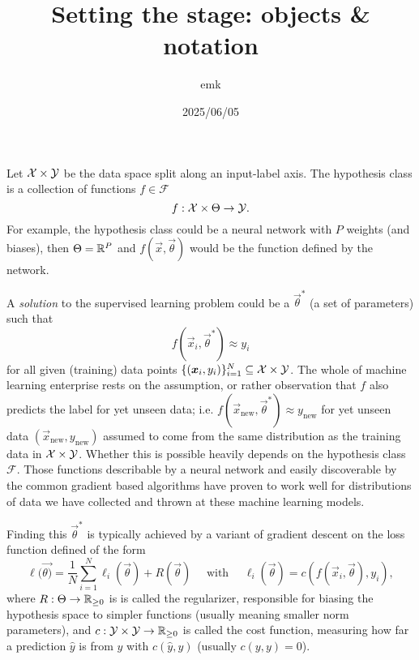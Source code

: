 \documentclass[12pt]{amsart}
\title{Setting the stage: objects \& notation}
\author{emk}
\date{2025/06/05}
\begin{document}
\maketitle

Let $\mathcal{X} \times \mathcal{Y}$ be the data space split along an input-label axis. The hypothesis class is a collection of functions $f \in \mathcal{F}$
\[
	f : \mathcal{X} \times \Theta \to \mathcal{Y}.
\]
For example, the hypothesis class could be a neural network with $P$ weights (and biases), then $\Theta = \mathbb{R}^P$ and $f(\vec{x}, \vec{\theta})$ would be the function defined by the network.


A \emph{solution} to the supervised learning problem could be a $\vec{\theta}^*$ (a set of parameters) such that $$f(\vec{x}_i, \vec{\theta}^*) \approx y_i$$
for all given (training) data points $\{(\mathbf{\boldsymbol{x}}_i, y_i)\}_{i = 1}^N \subseteq \mathcal{X} \times \mathcal{Y}$. The whole of machine learning enterprise rests on the assumption, or rather observation that $f$ also predicts the label for yet unseen data; i.e. $f(\vec{x}_{\text{new}}, \vec{\theta}^*) \approx y_{\text{new}}$ for yet unseen data $(\vec{x}_{\text{new}}, y_{\text{new}})$ assumed to come from the same distribution as the training data in $\mathcal{X} \times \mathcal{Y}$. Whether this is possible heavily depends on the hypothesis class $\mathcal{F}$. Those functions describable by a neural network and easily discoverable by the common gradient based algorithms have proven to work well for distributions of data we have collected and thrown at these machine learning models.

Finding this $\vec \theta^*$ is typically achieved by a variant of gradient descent on the loss function defined of the form
\begin{equation}\label{eq:lossfn}
	\ell(\vec{\theta)} = \frac{1}{N} \sum_{i = 1}^N \ell_i(\vec{\theta}) + R(\vec{\theta}) \quad \text{ with } \quad \ell_i(\vec{\theta}) = c(f(\vec{x}_i, \vec{\theta}), y_i),
\end{equation}
where $R :\Theta \to \mathbb{R}_{\geq 0 }$ is is called the regularizer, responsible for biasing the hypothesis space to simpler functions (usually meaning smaller norm parameters), and $c : \mathcal{Y} \times \mathcal{Y} \to \mathbb{R}_{\geq 0}$ is called the cost function, measuring how far a prediction $\hat y$ is from $y$ with  $c(\hat y, y)$ (usually $c(y, y) = 0$). 
\end{document}
